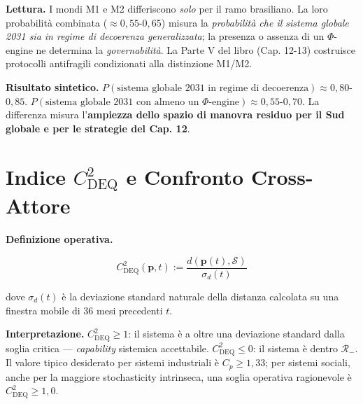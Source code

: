 \Hypoth{} \textbf{Lettura.} I mondi M1 e M2 differiscono \emph{solo} per
il ramo brasiliano. La loro probabilità combinata
(\(\approx 0{,}55\)-\(0{,}65\)) misura la \emph{probabilità che il
sistema globale 2031 sia in regime di decoerenza generalizzata}; la
presenza o assenza di un \(\Phi\)-engine ne determina la
\emph{governabilità}. La Parte V del libro (Cap. 12-13) costruisce
protocolli antifragili condizionati alla distinzione M1/M2.

\Proved{} \textbf{Risultato sintetico.}
\(P(\text{sistema globale 2031 in regime di decoerenza}) \approx 0{,}80\)-\(0{,}85\).
\(P(\text{sistema globale 2031 con almeno un $\Phi$-engine}) \approx 0{,}55\)-\(0{,}70\).
La differenza misura l'\textbf{ampiezza dello spazio di manovra residuo
per il Sud globale e per le strategie del Cap. 12}.



\section{\texorpdfstring{Indice \(C_{\text{DEQ}}^2\) e Confronto
Cross-Attore}{Indice C\_\{\textbackslash text\{DEQ\}\}\^{}2 e Confronto Cross-Attore}}\label{indice-c_textdeq2-e-confronto-cross-attore}

\Hypoth{} \textbf{Definizione operativa.}

\[
C_{\text{DEQ}}^2(\boldsymbol{p}, t) := \frac{d(\boldsymbol{p}(t), \mathcal{S})}{\sigma_d(t)}
\]

dove \(\sigma_d(t)\) è la deviazione standard naturale della distanza
calcolata su una finestra mobile di 36 mesi precedenti \(t\).

\Proved{} \textbf{Interpretazione.} \(C_{\text{DEQ}}^2 \geq 1\): il
sistema è a oltre una deviazione standard dalla soglia critica ---
\emph{capability} sistemica accettabile. \(C_{\text{DEQ}}^2 \leq 0\): il
sistema è dentro \(\mathcal{R}_-\). Il valore tipico desiderato per
sistemi industriali è \(C_p \geq 1{,}33\); per sistemi sociali, anche
per la maggiore stochasticity intrinseca, una soglia operativa
ragionevole è \(C_{\text{DEQ}}^2 \geq 1{,}0\).

